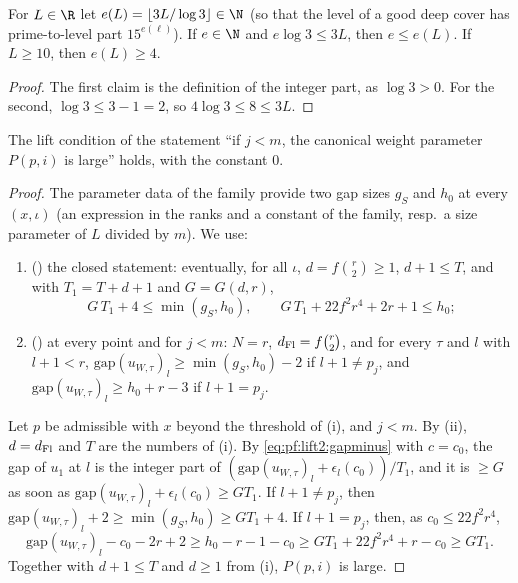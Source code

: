 \begin{lemma}\label{pf:lift2:expl}
For $L\in\R$ let $e(L)=\lfloor3L/\log3\rfloor\in\N$ (so that the level of a good deep cover has prime-to-level part
$15^{e(\ell)}$). If $e\in\N$ and $e\log3\le3L$, then $e\le e(L)$. If $L\ge10$, then $e(L)\ge4$.
\end{lemma}

\begin{proof}
The first claim is the definition of the integer part, as $\log3>0$. For the second, $\log3\le3-1=2$, so
$4\log3\le8\le3L$.
\end{proof}

\begin{proposition}\label{pf:lift2:wtbig}
The lift condition of the statement ``if $j<m$, the canonical weight parameter $P(p,i)$ is large'' holds, with the
constant $0$.
\end{proposition}

\begin{proof}
The parameter data of the family provide two gap sizes $g_S$ and $h_0$ at every $(x,\iota)$ (an expression in the
ranks and a constant of the family, resp.\ a size parameter of $L$ divided by $m$). We use:
\begin{enumerate}[label=(\roman*)]
\item () the closed statement: eventually, for all $\iota$,
$d=f\binom r2\ge1$, $d+1\le T$, and with $T_1=T+d+1$ and $G=G(d,r)$,
\[
G\,T_1+4\le\min(g_S,h_0),\qquad G\,T_1+22f^2r^4+2r+1\le h_0 ;
\]
\item () at every point and for $j<m$: $N=r$,
$d_{\mathrm{Fl}}=f\binom r2$, and for every $\tau$ and $l$ with $l+1<r$, $\mathrm{gap}(u_{W,\tau})_l\ge\min(g_S,h_0)-2$ if
$l+1\ne p_j$, and $\mathrm{gap}(u_{W,\tau})_l\ge h_0+r-3$ if $l+1=p_j$.
\end{enumerate}
Let $p$ be admissible with $x$ beyond the threshold of (i), and $j<m$. By (ii), $d=d_{\mathrm{Fl}}$ and $T$ are the numbers
of (i). By \eqref{eq:pf:lift2:gapminus} with $c=c_0$, the gap of $u_1$ at $l$ is the integer part of
$(\mathrm{gap}(u_{W,\tau})_l+\epsilon_l(c_0))/T_1$, and it is $\ge G$ as soon as
$\mathrm{gap}(u_{W,\tau})_l+\epsilon_l(c_0)\ge GT_1$. If $l+1\ne p_j$, then
$\mathrm{gap}(u_{W,\tau})_l+2\ge\min(g_S,h_0)\ge GT_1+4$. If $l+1=p_j$, then, as $c_0\le22f^2r^4$,
\[
\mathrm{gap}(u_{W,\tau})_l-c_0-2r+2\ge h_0-r-1-c_0\ge GT_1+22f^2r^4+r-c_0\ge GT_1 .
\]
Together with $d+1\le T$ and $d\ge1$ from (i), $P(p,i)$ is large.
\end{proof}

